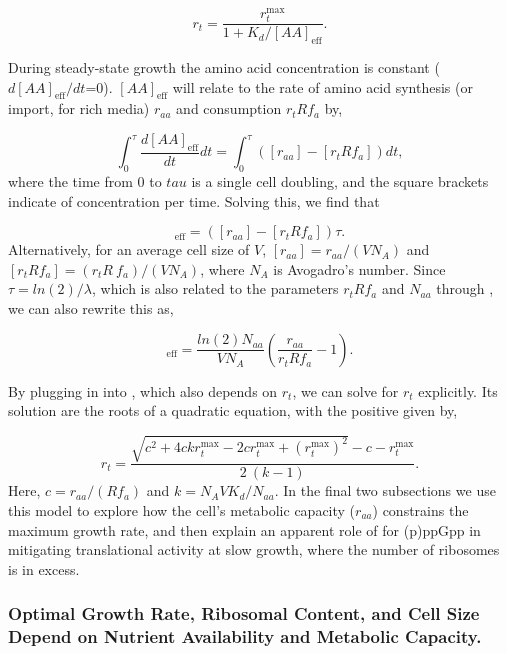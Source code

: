 \begin{equation}
r_t = \frac{r_{t}^{\text{max}}}{1 + K_d/[AA]_{\text{eff}}}.
\label{eq:rt_kd_simple}
\end{equation}

During steady-state
growth the amino acid concentration is constant ($d[AA]_{\text{eff}}/dt$=0). $[AA]_{\text{eff}}$
will relate to the
rate of amino acid synthesis (or import, for rich media)
$r_{aa}$ and consumption $r_t R f_a$ by,

\begin{equation}
\int_{0}^{\tau} \frac{d[AA]_{\text{eff}}}{dt} dt =  \int_{0}^{\tau} ([r_{aa}] - [r_t R f_a]) dt,
\end{equation}
where the time from 0 to $tau$ is a single cell doubling, and the square
brackets indicate of concentration per time. Solving this, we find that

\begin{equation}
[AA]_{\text{eff}} =  ([r_{aa}] - [r_t R f_a]) \tau.
\end{equation}
Alternatively, for an average cell size of $V$,  $[r_{aa}] = r_{aa}/(V N_A)$
and $[r_t R f_a] = (r_t R \ f_a)/(V N_A)$, where $N_A$ is Avogadro's
number. Since $\tau = ln(2)/\lambda$, which is also related to the parameters
$r_t R f_a$ and $N_{aa}$ through , we
can also rewrite this as,

\begin{equation}
[AA]_{\text{eff}} = \frac{ln(2) N_{aa}}{V N_A} \left(\frac{r_{aa}}{r_t R f_a} - 1 \right) .
\label{eq:aa_final}
\end{equation}


By plugging in  into , which also depends on $r_t$, we
can solve for $r_t$ explicitly. Its solution are the roots of a quadratic equation,
with the positive given by,

\begin{equation}
r_t = \frac{\sqrt{c^2 + 4 c k r_{t}^{\text{max}} - 2 c r_{t}^{\text{max}} + (r_{t}^{\text{max}})^2} - c - r_{t}^{\text{max}}}{2 \ (k-1)}.
\label{eq:rt_final}
\end{equation}
Here, $c = r_{aa}/(R f_a)$ and $k = N_A V K_d / N_{aa}$. In the final two
subsections we use this model to explore how the cell's metabolic capacity
($r_{aa}$) constrains the maximum growth rate, and then explain an apparent role
of for (p)ppGpp in mitigating translational activity at slow growth, where the
number of ribosomes is in excess.

\subsubsection{Optimal Growth Rate, Ribosomal Content, and Cell Size Depend on Nutrient
Availability and Metabolic Capacity.}

